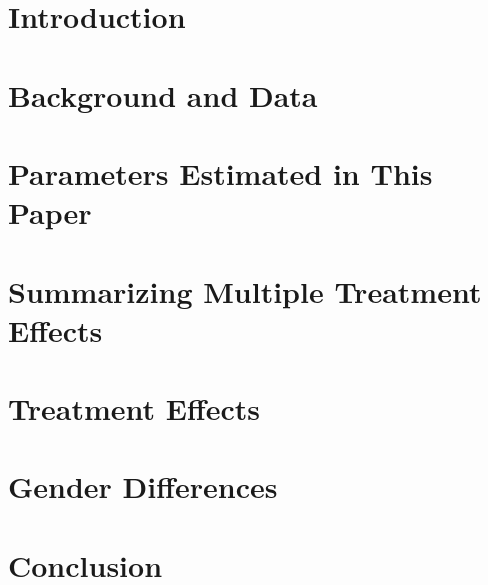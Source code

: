 \section{Introduction}
\label{sec:introduction}
	

\section{Background and Data}
\label{sec:data}


\section{Parameters Estimated in This Paper} 
\label{sec:parameters}


\section{Summarizing Multiple Treatment Effects}
\label{sec:combining-functions}


\section{Treatment Effects}
\label{sec:treatment-effects}


\section{Gender Differences}
\label{sec:gender-differences}


\section{Conclusion}
\label{sec:conclusion}


\clearpage
\singlespacing




